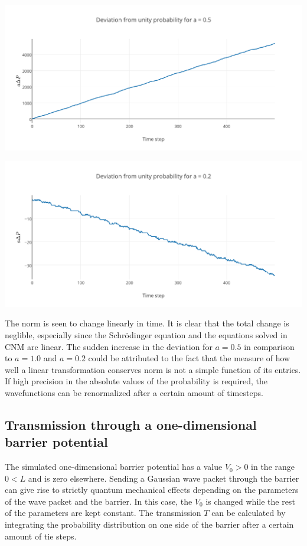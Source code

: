 \begin{Figure}
    \centering
    \includegraphics[width=\linewidth]{norma05.pdf}
    \label{fig:distancea05}
\end{Figure}

\begin{Figure}
    \centering
    \includegraphics[width=\linewidth]{norma02.pdf}
    \label{fig:distancea02}
\end{Figure} The norm is seen to change linearly in time. It is clear that the total change is neglible, especially since the Schr\"{o}dinger equation and the equations solved in CNM are linear. The sudden increase in the deviation for $a=0.5$ in comparison to $a=1.0$ and $a=0.2$ could be attributed to the fact that the measure of how well a linear transformation conserves norm is not a simple function of its entries. If high precision in the absolute values of the probability is required, the wavefunctions can be renormalized after a certain amount of timesteps.

\subsection*{Transmission through a one-dimensional barrier potential}
The simulated one-dimensional barrier potential has a value $V_0>0$ in the range $0<L$  and is zero elsewhere. Sending a Gaussian wave packet through the barrier can give rise to strictly quantum mechanical effects depending on the parameters of the wave packet and the barrier. In this case, the $V_0$ is changed while the rest of the parameters are kept constant. The transmission $T$ can be calculated by integrating the probability distribution on one side of the barrier after a certain amount of tie steps.
